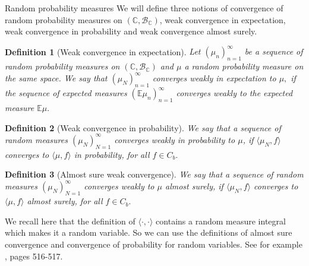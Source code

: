 \documentclass[11pt, a4paper, oneside]{book}
\numberwithin{equation}{chapter}
\newtheorem{definition}{Definition}[section]
\begin{document}
\begin{section}{Random probability measures}
We will define three notions of convergence of random probability measures on $(\mathbb{C},\mathcal{B}_{\mathbb{C}})$, weak convergence in expectation, weak convergence in probability and weak convergence almost surely.

\begin{definition}[Weak convergence in expectation] Let $(\mu_n)_{n=1}^\infty$ be a sequence of random probability measures on $(\mathbb{C},\mathcal{B}_{\mathbb{C}})$ and $\mu$ a random probability measure on the same space. We say that $(\mu_N)_{n=1}^\infty$ converges weakly in expectation to $\mu,$ if the sequence of expected measures $(\mathbb{E}\mu_n)_{n=1}^\infty$ converges weakly to the expected measure $\mathbb{E}\mu.$
\end{definition}

\begin{definition}[Weak convergence in probability] We say that a sequence of random measures $(\mu_N)_{N=1}^\infty$
converges weakly in probability to $\mu$, if $\langle \mu_N,f \rangle$ converges to $\langle \mu, f \rangle$ in probability, for all $f \in C_b.$
\end{definition}

\begin{definition}[Almost sure weak convergence] We say that a sequence of random measures $(\mu_N)_{N=1}^\infty$ converges weakly to $\mu$ almost surely, if $\langle \mu_N, f \rangle$ converges to $\langle \mu , f \rangle $ almost surely, for all $f \in C_b.$
\end{definition}

We recall here that the definition of $\langle \cdot , \cdot \rangle$ contains a random measure integral which makes it a random variable. So we can use the definitions of almost sure convergence and convergence of probability for random variables. See for example \cite{dudley2002real}, pages 516-517.
\end{section}
\end{document}
